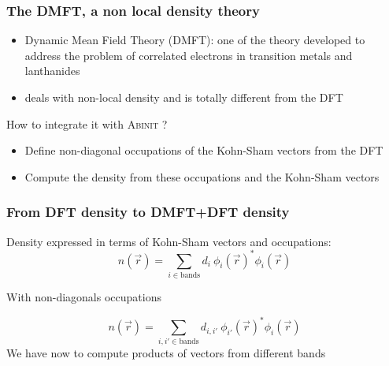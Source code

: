 \begin{frame}
  \frametitle{The DMFT, a non local density theory}
  \begin{itemize}
    \item Dynamic Mean Field Theory (DMFT): one of the theory developed
  to address the problem of correlated electrons in transition metals 
  and lanthanides
    \item deals with non-local density and is totally different from the DFT
  \end{itemize}
  How to integrate it with \textsc{Abinit} ?
  \begin{itemize}
    \item Define non-diagonal occupations of the Kohn-Sham vectors from the DFT
    \item Compute the density from these occupations and the Kohn-Sham vectors
  \end{itemize}
\end{frame}

\begin{frame}
  \frametitle{From DFT density to DMFT+DFT density}
  Density expressed in terms of Kohn-Sham vectors and occupations:
  \begin{equation}
    n(\vec{r}) = \sum_{i \in \text{bands}} d_i~\phi_i(\vec{r})^* \phi_i(\vec{r})
  \end{equation}

  With non-diagonals occupations

  \begin{equation}
    n(\vec{r}) = \sum_{i, i' \in \text{bands}} d_{i,i'}~\phi_{i'}(\vec{r})^* \phi_i(\vec{r})
  \end{equation}
  \alert{We have now to compute products of vectors from different bands}
\end{frame}
